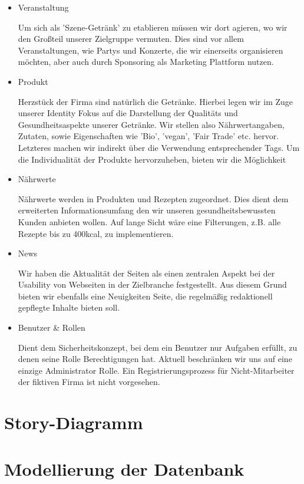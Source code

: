 \documentclass[12pt,a4paper,oneside,ngerman]{article}
\begin{document}
\begin{itemize}
\item Veranstaltung

Um sich als 'Szene-Getränk' zu etablieren müssen wir dort agieren, wo wir den Großteil unserer Zielgruppe vermuten.
Dies sind vor allem Veranstaltungen, wie Partys und Konzerte, die wir einerseits organisieren möchten, aber auch durch Sponsoring als Marketing Plattform nutzen.

\item Produkt

Herzstück der Firma sind natürlich die Getränke.
Hierbei legen wir im Zuge unserer Identity Fokus auf die Darstellung der Qualitäts und Gesundheitsaspekte unserer Getränke. 
Wir stellen also Nährwertangaben, Zutaten, sowie Eigenschaften wie 'Bio', 'vegan', 'Fair Trade' etc. hervor.
Letzteres machen wir indirekt über die Verwendung entsprechender Tags.
Um die Individualität der Produkte hervorzuheben, bieten wir die Möglichkeit 

\item Nährwerte

Nährwerte werden in Produkten und Rezepten zugeordnet. Dies dient dem erweiterten Informationsumfang den wir unseren gesundheitsbewussten Kunden anbieten wollen.
Auf lange Sicht wäre eine Filterungen, z.B. alle Rezepte bis zu 400kcal, zu implementieren.

\item News

Wir haben die Aktualität der Seiten als einen zentralen Aspekt bei der Usability von Webseiten in der Zielbranche festgestellt.
Aus diesem Grund bieten wir ebenfalls eine Neuigkeiten Seite, die regelmäßig redaktionell gepflegte Inhalte bieten soll.

\item Benutzer \& Rollen

Dient dem Sicherheitskonzept, bei dem ein Benutzer nur Aufgaben erfüllt, zu denen seine Rolle Berechtigungen hat. 
Aktuell beschränken wir uns auf eine einzige Administrator Rolle.
Ein Registrierungsprozess für Nicht-Mitarbeiter der fiktiven Firma ist nicht vorgesehen.

\end{itemize}


\section{Story-Diagramm} %



\section{Modellierung der Datenbank} %
\end{document}
